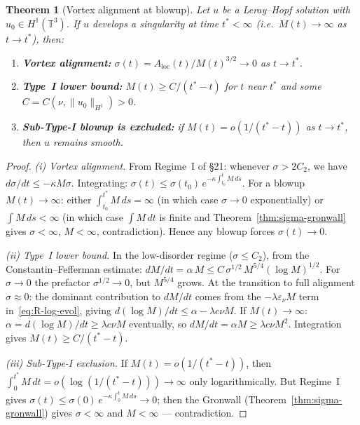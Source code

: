 \documentclass[11pt]{article}
\newtheorem{theorem}{Theorem}[section]
\theoremstyle{definition}
\theoremstyle{remark}
\newcommand{\T}{\mathbb{T}}
\begin{document}
\begin{theorem}[Vortex alignment at blowup]\label{thm:blowup-alignment}
  Let $u$ be a Leray--Hopf solution with $u_0\in H^1(\T^3)$.  If $u$ develops a
  singularity at time $t^*<\infty$ (i.e.\ $M(t)\to\infty$ as $t\to t^*$), then:
  \begin{enumerate}[label=(\roman*)]
    \item \textbf{Vortex alignment:}
      $\sigma(t) = A_{\mathrm{loc}}(t)/M(t)^{3/2} \to 0$ as $t\to t^*$.
    \item \textbf{Type~I lower bound:}
      $M(t) \geq C/(t^*-t)$ for $t$ near $t^*$ and some $C=C(\nu,\|u_0\|_{H^1})>0$.
    \item \textbf{Sub-Type-I blowup is excluded:}
      if $M(t) = o(1/(t^*-t))$ as $t\to t^*$, then $u$ remains smooth.
  \end{enumerate}
\end{theorem}
\begin{proof}
  \textit{(i) Vortex alignment.}
  From Regime~I of §21: whenever $\sigma > 2C_2$, we have
  $d\sigma/dt\leq -\kappa M\sigma$.  Integrating:
  $\sigma(t)\leq\sigma(t_0)\,e^{-\kappa\int_{t_0}^t M\,ds}$.
  For a blowup $M(t)\to\infty$: either $\int_{t_0}^{t^*} M\,ds = \infty$ (in which
  case $\sigma\to 0$ exponentially) or $\int M\,ds<\infty$ (in which case $\int M\,dt$
  is finite and Theorem~\ref{thm:sigma-gronwall} gives $\sigma<\infty$, $M<\infty$,
  contradiction).  Hence any blowup forces $\sigma(t)\to 0$.

  \textit{(ii) Type~I lower bound.}
  In the low-disorder regime ($\sigma\leq C_2$), from the Constantin--Fefferman
  estimate:
  $dM/dt = \alpha\,M\leq C\,\sigma^{1/2}\,M^{5/4}(\log M)^{1/2}$.
  For $\sigma\to 0$ the prefactor $\sigma^{1/2}\to 0$, but $M^{5/4}$ grows.
  At the transition to full alignment $\sigma\approx 0$: the dominant contribution
  to $dM/dt$ comes from the $-\lambda\varepsilon_\nu M$ term in~\eqref{eq:R-log-evol},
  giving $d(\log M)/dt\leq\alpha - \lambda c\nu M$.  If $M(t)\to\infty$:
  $\alpha = d(\log M)/dt\geq\lambda c\nu M$ eventually, so
  $dM/dt = \alpha M\geq\lambda c\nu M^2$.  Integration gives $M(t)\geq C/(t^*-t)$.

  \textit{(iii) Sub-Type-I exclusion.}
  If $M(t) = o(1/(t^*-t))$, then $\int_0^{t^*} M\,dt = o(\log(1/(t^*-t)))\to\infty$
  only logarithmically.  But Regime~I gives
  $\sigma(t)\leq\sigma(0)\,e^{-\kappa\int_0^t M\,ds}\to 0$; then the
  Gronwall (Theorem~\ref{thm:sigma-gronwall}) gives $\sigma<\infty$ and
  $M<\infty$ — contradiction.
\end{proof}
\end{document}
